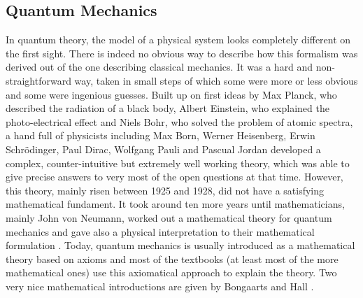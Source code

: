 \subsection{Quantum Mechanics}
\label{subsec:chap2_Quantum}

In quantum theory, the model of a physical system looks completely different on 
the first sight. There is indeed no obvious way to describe how this formalism was 
derived out of the one describing classical mechanics. It was a hard 
and non-straightforward way, taken in small steps of which some were 
more or less obvious and some were ingenious guesses. Built up on first ideas 
by Max Planck, who described the radiation of a black body, Albert Einstein, 
who explained the photo-electrical effect and Niels Bohr, who solved the 
problem of atomic spectra, a hand full of physicists including Max Born, 
Werner Heisenberg, Erwin Schr\"odinger, Paul Dirac, Wolfgang Pauli and Pascual 
Jordan developed a complex, counter-intuitive but extremely well working theory, 
which was able to give precise answers to very most of the open questions at that 
time. However, this theory, mainly risen between 1925 and 1928, did not have a 
satisfying mathematical fundament. It took around ten more years until 
mathematicians, mainly John von Neumann, worked out a mathematical theory for 
quantum mechanics and gave also a physical interpretation to their mathematical 
formulation \cite{vonneumann:1996a}. Today, quantum mechanics is usually 
introduced as a mathematical theory based on axioms and most of the textbooks 
(at least most of the more mathematical ones) use this axiomatical approach to 
explain the theory. Two very nice mathematical introductions are given by 
Bongaarts \cite{bongaarts:2015a} and Hall \cite{hall:2013a}.


